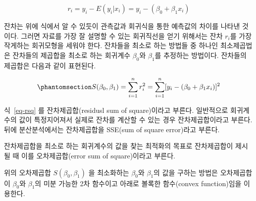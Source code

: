 \documentclass[
  11pt,
  a4paper,
  oneside]{scrbook}
\theoremstyle{definition}
\theoremstyle{plain}
\theoremstyle{definition}
\theoremstyle{definition}
\theoremstyle{remark}
\begin{document}
\[  r_i = y_i - E(y_i|x_i) = y_i - (  \beta_0 +  \beta_1 x_i) \]

잔차는 위에 식에서 알 수 있듯이 관측값과 회귀식을 통한 예측값의 차이를
나타낸 것이다. 그러면 자료를 가장 잘 설명할 수 있는 회귀직선을 얻기
위해서는 잔차 \(r_i\)를 가장 작게하는 회귀모형을 세워야 한다. 잔차들을
최소로 하는 방법들 중 하나인 최소제곱법은 잔차들의 제곱합을 최소로 하는
회귀계수 \(\beta_0\)와 \(\beta_1\)를 추정하는 방법이다. 잔차들의
제곱합은 다음과 같이 표현된다.

\begin{equation}\phantomsection\label{eq-rsq}{
 S(\beta_0 , \beta_1) = \sum^n_{i=1}r^2_i = \sum^n_{i=1}[y_i-(\beta_0 + \beta_1 x_i)]^2 
}\end{equation}

\begin{tcolorbox}[enhanced jigsaw, colback=white, title=\textcolor{quarto-callout-note-color}{\faInfo}\hspace{0.5em}{노트}, colbacktitle=quarto-callout-note-color!10!white, toprule=.15mm, breakable, bottomtitle=1mm, left=2mm, colframe=quarto-callout-note-color-frame, leftrule=.75mm, coltitle=black, toptitle=1mm, titlerule=0mm, arc=.35mm, opacityback=0, opacitybacktitle=0.6, rightrule=.15mm, bottomrule=.15mm]

식~\ref{eq-rsq} 를 잔차제곱합(residusl sum of square)이라고 부른다.
일반적으로 회귀계수의 값이 특정지어져서 실제로 잔차를 계산할 수 있는
경우 잔차제곱합이라고 부른다. 뒤에 분산분석에서는 잔차제곱합을 SSE(sum
of square error)라고 부른다.

잔차제곱합을 최소로 하는 회귀계수의 값을 찾는 최적화의 목표로
잔차제곱합이 제시될 때 이를 오차제곱합(error sum of square)이라고
부른다.

\end{tcolorbox}

위의 오차제곱합 \(S(\beta_0 , \beta_1)\) 을 최소화하는 \(\beta_0\)와
\(\beta_1\)의 값을 구하는 방법은 오차제곱합이 \(\beta_0\)와
\(\beta_1\)의 미분 가능한 2차 함수이고 아래로 볼록한 함수(convex
function)임을 이용한다.
\end{document}

